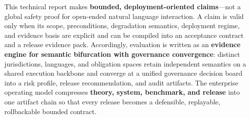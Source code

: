 \documentclass[11pt,a4paper]{report}
\begin{document}
\begin{bluebookabstract}
This technical report makes \textbf{bounded, deployment-oriented claims}---not a global safety proof for open-ended natural language interaction. A claim is valid only when its scope, preconditions, degradation semantics, deployment regime, and evidence basis are explicit and can be compiled into an acceptance contract and a release evidence pack. Accordingly, evaluation is written as an \textbf{evidence engine for semantic bifurcation with governance convergence}: distinct jurisdictions, languages, and obligation spaces retain independent semantics on a shared execution backbone and converge at a unified governance decision board into a risk profile, release recommendation, and audit artifacts. The enterprise operating model compresses \textbf{theory, system, benchmark, and release} into one artifact chain so that every release becomes a defensible, replayable, rollbackable bounded contract.

\end{bluebookabstract}
\end{document}
